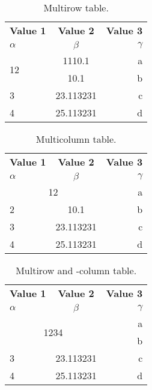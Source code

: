 \documentclass{article}
\begin{document}

\begin{table}[h!]
  \begin{center}
    \caption{Multirow table.}
    \label{tab:table1}
    \begin{tabular}{l|c|r}
      \textbf{Value 1} & \textbf{Value 2} & \textbf{Value 3}\\
      $\alpha$ & $\beta$ & $\gamma$ \\
      \hline
      \multirow{2}{*}{12} & 1110.1 & a\\ %
      & 10.1 & b\\ %
      \hline
      3 & 23.113231 & c\\
      4 & 25.113231 & d\\
    \end{tabular}
  \end{center}
\end{table}



\begin{table}[h!]
  \begin{center}
    \caption{Multicolumn table.}
    \label{tab:table1}
    \begin{tabular}{l|c|r}
      \textbf{Value 1} & \textbf{Value 2} & \textbf{Value 3}\\
      $\alpha$ & $\beta$ & $\gamma$ \\
      \hline
      \multicolumn{2}{c|}{12} & a\\ %
      \hline
      2 & 10.1 & b\\
      3 & 23.113231 & c\\
      4 & 25.113231 & d\\
    \end{tabular}
  \end{center}
\end{table}



\begin{table}[h!]
  \begin{center}
    \caption{Multirow and -column table.}
    \label{tab:table1}
    \begin{tabular}{l|c|r}
      \textbf{Value 1} & \textbf{Value 2} & \textbf{Value 3}\\
      $\alpha$ & $\beta$ & $\gamma$ \\
      \hline
      \multicolumn{2}{c|}{\multirow{2}{*}{1234}} & a\\ %
      \multicolumn{2}{c|}{} & b\\ %
      \hline
      3 & 23.113231 & c\\
      4 & 25.113231 & d\\
    \end{tabular}
  \end{center}
\end{table}
\end{document}
